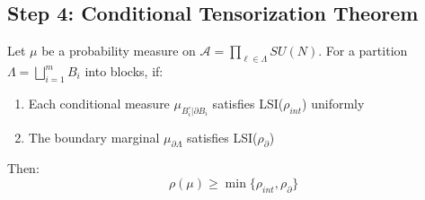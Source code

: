 \subsection{Step 4: Conditional Tensorization Theorem}

\begin{theorem}
\label{thm:conditional-tensor-app111_roadmap_hierarchical_zegarlinski}
Let $\mu$ be a probability measure on $\mathcal{A} = \prod_{\ell \in \Lambda} SU(N)$.
For a partition $\Lambda = \bigsqcup_{i=1}^m B_i$ into blocks, if:
\begin{enumerate}
\item Each conditional measure $\mu_{B_i^\circ | \partial B_i}$ satisfies LSI($\rho_{int}$) uniformly
\item The boundary marginal $\mu_{\partial \Lambda}$ satisfies LSI($\rho_{\partial}$)
\end{enumerate}
Then:
\begin{equation}
\rho(\mu) \geq \min\{\rho_{int}, \rho_{\partial}\}
\end{equation}
\end{theorem}

